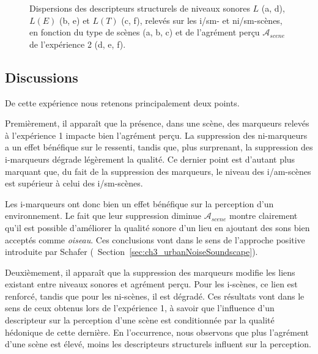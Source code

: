 \begin{figure}[t]
        \caption{Dispersions des descripteurs structurels de niveaux sonores $L$ (a, d), $L(E)$ (b, e) et $L(T)$ (c, f), relevés sur les i/sm- et ni/sm-scènes, en fonction du type de scènes (a, b, c) et de l'agrément perçu $\mathcal{A}_{scene}$ de l'expérience 2 (d, e, f).}\label{fig:soundlevelSansMarker}
\end{figure}

\subsection{Discussions}

De cette expérience nous retenons principalement deux points.

Premièrement, il apparaît que la présence, dans une scène, des marqueurs relevés à l'expérience 1 impacte bien l'agrément perçu. La suppression des ni-marqueurs a un effet bénéfique sur le ressenti, tandis que, plus surprenant, la suppression des i-marqueurs dégrade légèrement la qualité. Ce dernier point est d'autant plus marquant que, du fait de la suppression des marqueurs, le niveau des i/am-scènes est supérieur à celui des i/sm-scènes.

Les i-marqueurs ont donc bien un effet bénéfique sur la perception d'un environnement. Le fait que leur suppression diminue $\mathcal{A}_{scene}$ montre clairement qu'il est possible d'améliorer la qualité sonore d'un lieu en ajoutant des sons bien acceptés comme \emph{oiseau}. Ces conclusions vont dans le sens de l'approche positive introduite par Schafer \citep{schafer1977tuning} (\cf~Section~\ref{sec:ch3_urbanNoiseSoundscape}).

Deuxièmement, il apparaît que la suppression des marqueurs modifie les liens existant entre niveaux sonores et agrément perçu. Pour les i-scènes, ce lien est renforcé, tandis que pour les ni-scènes, il est dégradé. Ces résultats vont dans le sens de ceux obtenus lors de l'expérience 1, à savoir que l'influence d'un descripteur sur la perception d'une scène est conditionnée par la qualité hédonique de cette dernière. En l'occurrence, nous observons que plus l'agrément d'une scène est élevé, moins les descripteurs structurels influent sur la perception.

